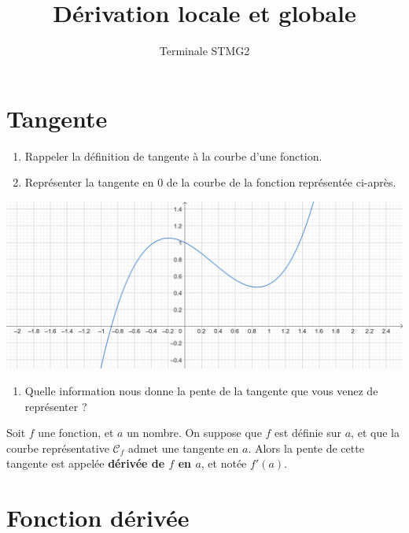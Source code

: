 \documentclass{article}
\title{Dérivation locale et globale}
\author{Terminale STMG2}
\date{}
\begin{document}
\maketitle

\section{Tangente}
\begin{enumerate}
\item Rappeler la définition de tangente à la courbe d'une fonction.

\answersline
\item Représenter la tangente en $0$ de la courbe de la fonction représentée ci-après.
\end{enumerate}

\begin{center}
\includegraphics[width=\textwidth]{Courbe_1.png}
\end{center}
\begin{enumerate}[resume]
\item Quelle information nous donne la pente de la tangente que vous venez de représenter ?

\answersline
\end{enumerate}
\begin{tcolorbox}
\begin{definition}
Soit $f$ une fonction, et $a$ un nombre. On suppose que $f$ est définie sur $a$, et que la courbe représentative $\mathcal{C}_f$ admet une tangente en $a$. Alors la pente de cette tangente est appelée \textbf{dérivée de $f$ en $a$}, et notée $f'(a)$.
\end{definition}
\end{tcolorbox}

\section{Fonction dérivée}
\end{document}
